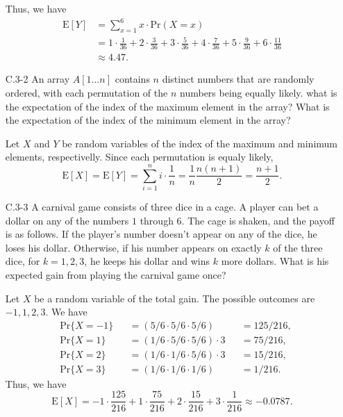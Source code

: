 \begin{enumerate}
\begin{framed}
Thus, we have
\begin{equation*}
\begin{aligned}
  \text{E}[Y] &= \sum_{x = 1}^{6} x \cdot \text{Pr}(X = x)\\
              &= 1 \cdot \frac{1}{36} + 2 \cdot \frac{3}{36} + 3 \cdot \frac{5}{36} + 4 \cdot \frac{7}{36}
               + 5 \cdot \frac{9}{36} + 6 \cdot \frac{11}{36}\\
              &\approx 4.47.
\end{aligned}
\end{equation*}

\end{framed}

\item[C.3{-}2]{An array $A[1 \dots n]$ contains $n$ distinct numbers that are
randomly ordered, with each permutation of the $n$ numbers being equally
likely. what is the expectation of the index of the maximum element in the
array? What is the expectation of the index of the minimum element in the
array?}

\begin{framed}
Let $X$ and $Y$ be random variables of the index of the maximum and minimum
elements, respectivelly. Since each permutation is equaly likely,
\[
  \text{E}[X] = \text{E}[Y] = \sum_{i = 1}^{n} i \cdot \frac{1}{n} = \frac{1}{n} \frac{n (n + 1)}{2} = \frac{n + 1}{2}.
\]
\end{framed}

\newpage

\item[C.3{-}3]{A carnival game consists of three dice in a cage. A player can
bet a dollar on any of the numbers $1$ through $6$. The cage is shaken, and
the payoff is as follows. If the player's number doesn't appear on any of
the dice, he loses his dollar. Otherwise, if his number appears on exactly
$k$ of the three dice, for $k = 1, 2, 3$, he keeps his dollar and wins $k$
more dollars. What is his expected gain from playing the carnival game
once?}

\begin{framed}
Let $X$ be a random variable of the total gain. The possible outcomes are
$-1, 1, 2, 3$. We have
\begin{equation*}
\begin{aligned}
  & \text{Pr}\{X = -1\} &&= (5/6 \cdot 5/6 \cdot 5/6)         &&= 125/216,\\
  & \text{Pr}\{X = 1\}  &&= (1/6 \cdot 5/6 \cdot 5/6) \cdot 3 &&= 75/216,\\
  & \text{Pr}\{X = 2\}  &&= (1/6 \cdot 1/6 \cdot 5/6) \cdot 3 &&= 15/216,\\
  & \text{Pr}\{X = 3\}  &&= (1/6 \cdot 1/6 \cdot 1/6)         &&= 1/216.
\end{aligned}
\end{equation*}
Thus, we have
\[
  \text{E}[X] = -1 \cdot \frac{125}{216} + 1 \cdot \frac{75}{216} + 2 \cdot \frac{15}{216} + 3 \cdot \frac{1}{216} \approx -0.0787.
\]
\end{framed}


\end{enumerate}
